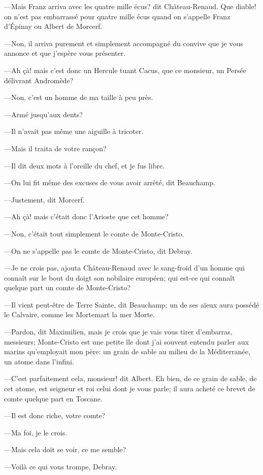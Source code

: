 —Mais Franz arriva avec les quatre mille écus? dit Château-Renaud. Que diable! on n'est pas embarrassé pour quatre mille écus quand on s'appelle Franz d'Épinay ou Albert de Morcerf. 

—Non, il arriva purement et simplement accompagné du convive que je vous annonce et que j'espère vous présenter. 

—Ah çà! mais c'est donc un Hercule tuant Cacus, que ce monsieur, un Persée délivrant Andromède? 

—Non, c'est un homme de ma taille à peu près. 

—Armé jusqu'aux dents? 

—Il n'avait pas même une aiguille à tricoter. 

—Mais il traita de votre rançon? 

—Il dit deux mots à l'oreille du chef, et je fus libre. 

—On lui fit même des excuses de vous avoir arrêté, dit Beauchamp. 

—Justement, dit Morcerf.  

—Ah çà! mais c'était donc l'Arioste que cet homme? 

—Non, c'était tout simplement le comte de Monte-Cristo. 

—On ne s'appelle pas le comte de Monte-Cristo, dit Debray. 

—Je ne crois pas, ajouta Château-Renaud avec le sang-froid d'un homme qui connaît sur le bout du doigt son nobilaire européen; qui est-ce qui connaît quelque part un comte de Monte-Cristo? 

—Il vient peut-être de Terre Sainte, dit Beauchamp; un de ses aïeux aura possédé le Calvaire, comme les Mortemart la mer Morte. 

—Pardon, dit Maximilien, mais je crois que je vais vous tirer d'embarras, messieurs; Monte-Cristo est une petite île dont j'ai souvent entendu parler aux marins qu'employait mon père: un grain de sable au milieu de la Méditerranée, un atome dans l'infini. 

—C'est parfaitement cela, monsieur! dit Albert. Eh bien, de ce grain de sable, de cet atome, est seigneur et roi celui dont je vous parle; il aura acheté ce brevet de comte quelque part en Toscane. 

—Il est donc riche, votre comte? 

—Ma foi, je le crois. 

—Mais cela doit se voir, ce me semble?  

—Voilà ce qui vous trompe, Debray. 

